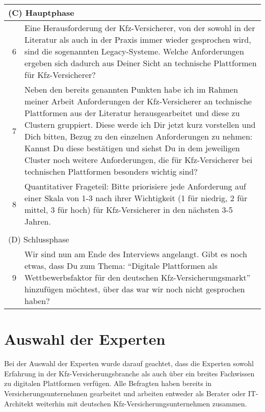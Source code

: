 \begin{table}[H]
\begin{tabularx}{\linewidth}{lX}
\multicolumn{2}{l}{(C) Hauptphase} \\\hline \hline
    \  6 & Eine Herausforderung der Kfz-Versicherer, von der sowohl in der Literatur als auch in der Praxis immer wieder gesprochen wird, sind die sogenannten Legacy-Systeme. Welche Anforderungen ergeben sich dadurch aus Deiner Sicht an technische Plattformen für Kfz-Versicherer? \\\hline
    \  7 & Neben den bereits genannten Punkten habe ich im Rahmen meiner Arbeit Anforderungen der Kfz-Versicherer an technische Plattformen aus der Literatur herausgearbeitet und diese zu Clustern gruppiert. Diese werde ich Dir jetzt kurz vorstellen und Dich bitten, Bezug zu den einzelnen Anforderungen zu nehmen: Kannst Du diese bestätigen und siehst Du in dem jeweiligen Cluster noch weitere Anforderungen, die für Kfz-Versicherer bei technischen Plattformen besonders wichtig sind? \\\hline       
    \  8 & Quantitativer Frageteil: Bitte priorisiere jede Anforderung auf einer Skala von 1-3 nach ihrer Wichtigkeit (1 für niedrig, 2 für mittel, 3 für hoch) für Kfz-Versicherer in den nächsten 3-5 Jahren. \\\hline
    \\
    \multicolumn{2}{l}{(D) Schlussphase}  \\\hline \hline
    \  9 & Wir sind nun am Ende des Interviews angelangt. Gibt es noch etwas, dass Du zum Thema: \enquote{Digitale Plattformen als Wettbewerbsfaktor für den deutschen Kfz-Versicherungsmarkt} hinzufügen möchtest, über das war wir noch nicht gesprochen haben? \\\hline
\end{tabularx}
\end{table} 

\section{Auswahl der Experten}
\label{sec:Expertenwahl}
Bei der Auswahl der Experten wurde darauf geachtet, dass die Experten sowohl Erfahrung in der Kfz-Versicherungsbranche als auch über ein breites Fachwissen zu digitalen Plattformen verfügen. Alle Befragten haben bereits in Versicherungsunternehmen gearbeitet und arbeiten entweder als Berater oder IT-Architekt weiterhin mit deutschen Kfz-Versicherungsunternehmen zusammen.


